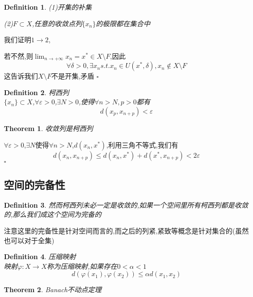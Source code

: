 \documentclass[11pt,hyperref,a4paper,UTF8]{ctexart}
\newtheorem{theorem}{Theorem}[subsection]
\newtheorem{definition}{Definition}[subsection]
\newenvironment{cproof}{%
\heiti{证明}\kaishu
}{%
  \hfill $\square$
  \par\bigskip
}
\begin{document}
\begin{CJK}{UTF8}{gkai}
\begin{definition}
  (1)开集的补集

  (2)$F \subset X$,任意的收敛点列$\{x_n\}$的极限都在集合中
\end{definition}

\begin{cproof}
  我们证明$1\to 2$,

  若不然,则$\lim_{n \to +\infty} x_n = x^\ast \in X\setminus F$,因此
  \[\forall \delta > 0,\exists x_n s.t. x_n \in U(x^\ast,\delta),x_n \notin X\setminus F\]
  这告诉我们$X\setminus F$不是开集,矛盾
\end{cproof}

\begin{definition}
  柯西列\\

  $\{x_n\} \subset X$,$\forall \varepsilon > 0$,$\exists N > 0$,使得$\forall n > N,p > 0$都有
  \[d(x_p,x_{n + p}) < \varepsilon\]
\end{definition}

\begin{theorem}
  收敛列是柯西列
\end{theorem}

\begin{cproof}
  $\forall \varepsilon > 0$,$\exists N$使得$\forall n > N$,$d(x_n,x^\ast)$,利用三角不等式,我们有
  \[d(x_n,x_{n + p} )\leq d(x_n,x^\ast ) + d(x^\ast,x_{n + p} ) < 2 \varepsilon\]
\end{cproof}

\subsection{空间的完备性}
\begin{definition}
  然而柯西列未必一定是收敛的,如果一个空间里所有柯西列都是收敛的,那么我们成这个空间为完备的\\
\end{definition}

注意这里的完备性是针对空间而言的,而之后的列紧,紧致等概念是针对集合的(虽然也可以对于全集)

\begin{definition}
  压缩映射\\

  映射$\varphi: X \to X$称为压缩映射,如果存在$0 < \alpha < 1$
  \[d(\varphi(x_1),\varphi(x_2)) \leq \alpha d(x_1,x_2)\]
\end{definition}

\begin{theorem}
  Banach不动点定理\\


\end{theorem}
\end{CJK}
\end{document}
